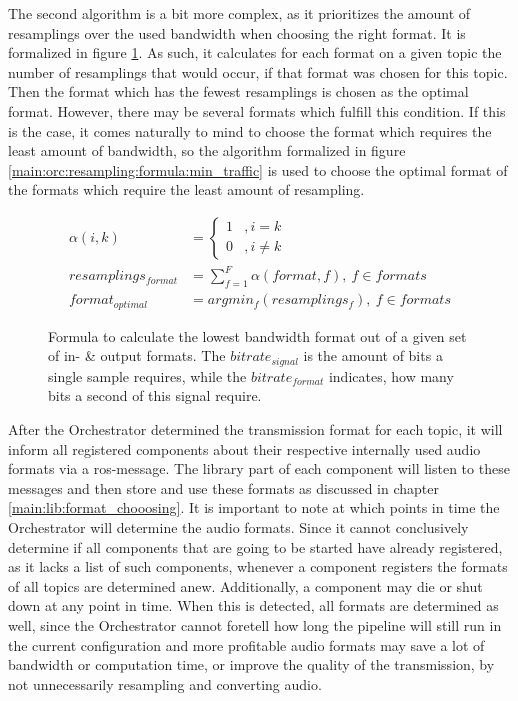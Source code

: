 The second algorithm is a bit more complex, as it prioritizes the amount of resamplings over the used bandwidth when choosing the right format.
It is formalized in figure \ref{main:orc:resampling:formula:min_cpu}.
As such, it calculates for each format on a given topic the number of resamplings that would occur, if that format was chosen for this topic.
Then the format which has the fewest resamplings is chosen as the optimal format.
However, there may be several formats which fulfill this condition.
If this is the case, it comes naturally to mind to choose the format which requires the least amount of bandwidth, so the algorithm formalized in figure \ref{main:orc:resampling:formula:min_traffic} is used to choose the optimal format of the formats which require the least amount of resampling.

\begin{figure}
	\begin{align*}
	\alpha(i,k) &=
	\begin{cases}
	1 & , i = k \\
	0 & , i \neq k
	\end{cases} \\[10pt]
	resamplings_{format} &= \sum_{f=1}^{F} \alpha(format, f) ,\ f \in formats\\[10pt]
	format_{optimal} &= argmin_{f}(resamplings_{f}) , \ f \in formats
	\end{align*}
	\caption{Formula to calculate the lowest bandwidth format out of a given set of in- \& output formats.
		The $bitrate_{signal}$ is the amount of bits a single sample requires, while the $bitrate_{format}$ indicates, how many bits a second of this signal require.}
	\label{main:orc:resampling:formula:min_cpu}
\end{figure}

After the Orchestrator determined the transmission format for each topic, it will inform all registered components about their respective internally used audio formats via a \gls{ros}-message.
The library part of each component will listen to these messages and then store and use these formats as discussed in chapter \ref{main:lib:format_chooosing}.
It is important to note at which points in time the Orchestrator will determine the audio formats.
Since it cannot conclusively determine if all components that are going to be started have already registered, as it lacks a list of such components, whenever a component registers the formats of all topics are determined anew.
Additionally, a component may die or shut down at any point in time.
When this is detected, all formats are determined as well, since the Orchestrator cannot foretell how long the pipeline will still run in the current configuration and more profitable audio formats may save a lot of bandwidth or computation time, or improve the quality of the transmission, by not unnecessarily resampling and converting audio.  

